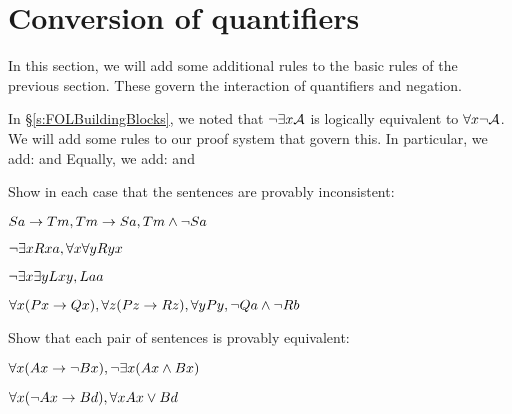 \chapter{Conversion of quantifiers}\label{s:CQ}

In this section, we will add some additional rules to the basic rules of the previous section. These govern the interaction of quantifiers and negation.
 
In \S\ref{s:FOLBuildingBlocks}, we noted that $\neg\exists x\mathcal{A}$ is logically equivalent to $\forall x \neg\mathcal{A}$. We will add some rules to our proof system that govern this. In particular, we add:
and
Equally, we add:
and

\practiceproblems
\problempart
Show in each case that the sentences are provably inconsistent:
\begin{earg}
\item $Sa\rightarrow Tm, Tm \rightarrow Sa, Tm \wedge \neg Sa$
\item $\neg\exists x Rxa, \forall x \forall y Ryx$
\item $\neg\exists x \exists y Lxy, Laa$
\item $\forall x(Px \rightarrow Qx), \forall z(Pz \rightarrow Rz), \forall y Py, \neg Qa \wedge \neg Rb$
\end{earg}

\problempart
Show that each pair of sentences is provably equivalent:
\begin{earg}
\item $\forall x (Ax\rightarrow \neg Bx), \neg\exists x(Ax \wedge Bx)$
\item $\forall x (\neg Ax\rightarrow Bd), \forall x Ax \vee Bd$
\end{earg}

